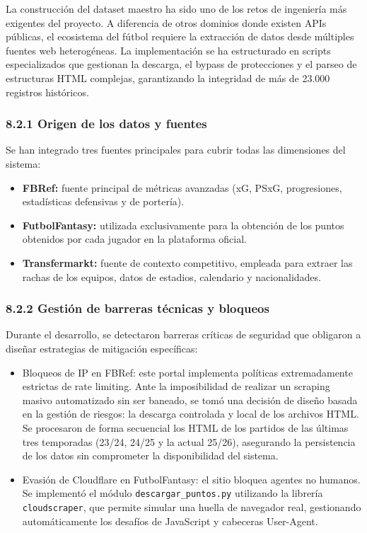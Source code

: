 La construcción del dataset maestro ha sido uno de los retos de ingeniería más exigentes del proyecto. A diferencia de otros dominios donde existen APIs públicas,
 el ecosistema del fútbol requiere la extracción de datos desde múltiples fuentes web heterogéneas. La implementación se ha estructurado en scripts especializados 
 que gestionan la descarga, el bypass de protecciones y el parseo de estructuras HTML complejas, garantizando la integridad de más de 23.000 registros históricos.

\subsubsection{8.2.1 Origen de los datos y fuentes}

Se han integrado tres fuentes principales para cubrir todas las dimensiones del sistema:

\begin{itemize}
\item \textbf{FBRef:} fuente principal de métricas avanzadas (xG, PSxG, progresiones, estadísticas defensivas y de portería).
\item \textbf{FutbolFantasy:} utilizada exclusivamente para la obtención de  los puntos obtenidos por cada jugador en la plataforma oficial.
\item \textbf{Transfermarkt:} fuente de contexto competitivo, empleada para extraer las rachas de los equipos, datos de estadios, calendario y nacionalidades.
\end{itemize}

\subsubsection{8.2.2 Gestión de barreras técnicas y bloqueos}

Durante el desarrollo, se detectaron barreras críticas de seguridad que obligaron a diseñar estrategias de mitigación específicas:

\begin{itemize}
\item Bloqueos de IP en FBRef: este portal implementa políticas extremadamente estrictas de rate limiting. Ante la imposibilidad de realizar un scraping masivo 
automatizado sin ser baneado, se tomó una decisión de diseño basada en la gestión de riesgos: la descarga controlada y local de los archivos HTML. Se procesaron 
de forma secuencial los HTML de los partidos de las últimas tres temporadas (23/24, 24/25 y la actual 25/26), asegurando la persistencia de los datos sin comprometer 
la disponibilidad del sistema.

\item Evasión de Cloudflare en FutbolFantasy: el sitio bloquea agentes no humanos. Se implementó el módulo \texttt{descargar\_puntos.py} utilizando la librería \texttt{cloudscraper}, que permite simular una huella de navegador real, gestionando automáticamente los desafíos de JavaScript y cabeceras User-Agent.
\end{itemize}

